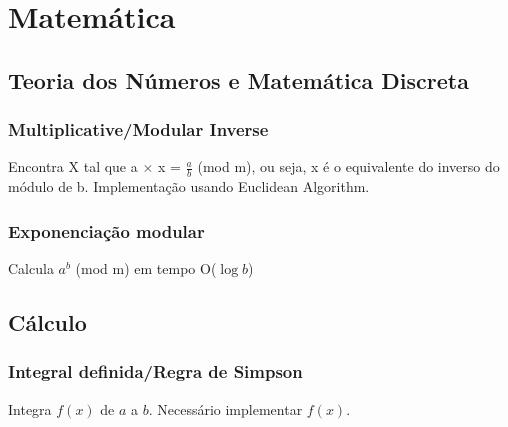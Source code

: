 \section{Matemática}

\subsection{Teoria dos Números e Matemática Discreta}


\subsubsection{Multiplicative/Modular Inverse}
Encontra X tal que a $\times$ x = $\frac{a}{b}$ (mod m), ou seja, x é o equivalente do inverso do módulo de b. Implementação usando Euclidean Algorithm.
\divisor

\subsubsection{Exponenciação modular}
Calcula $a^b$ (mod m) em tempo O($\log{b}$)
\divisor



\subsection{Cálculo}

\subsubsection{Integral definida/Regra de Simpson}
Integra $f(x)$ de $a$ a $b$. Necessário implementar $f(x)$.

\divisor
